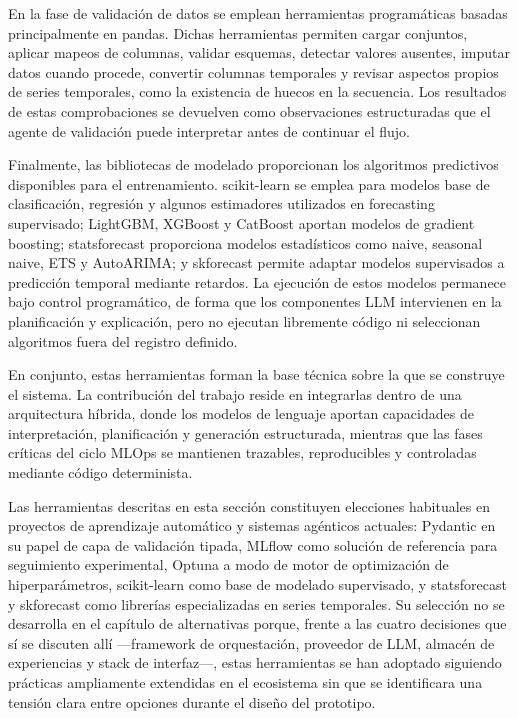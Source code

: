 \documentclass[12pt,a4paper]{article}
\theoremstyle{plain}
\begin{document}
En la fase de validación de datos se emplean herramientas programáticas basadas principalmente en pandas. Dichas herramientas permiten cargar conjuntos, aplicar mapeos de columnas, validar esquemas, detectar valores ausentes, imputar datos cuando procede, convertir columnas temporales y revisar aspectos propios de series temporales, como la existencia de huecos en la secuencia. Los resultados de estas comprobaciones se devuelven como observaciones estructuradas que el agente de validación puede interpretar antes de continuar el flujo.

Finalmente, las bibliotecas de modelado proporcionan los algoritmos predictivos disponibles para el entrenamiento. scikit-learn se emplea para modelos base de clasificación, regresión y algunos estimadores utilizados en forecasting supervisado; LightGBM, XGBoost y CatBoost aportan modelos de gradient boosting; statsforecast proporciona modelos estadísticos como naive, seasonal naive, ETS y AutoARIMA; y skforecast permite adaptar modelos supervisados a predicción temporal mediante retardos. La ejecución de estos modelos permanece bajo control programático, de forma que los componentes LLM intervienen en la planificación y explicación, pero no ejecutan libremente código ni seleccionan algoritmos fuera del registro definido.

En conjunto, estas herramientas forman la base técnica sobre la que se construye el sistema. La contribución del trabajo reside en integrarlas dentro de una arquitectura híbrida, donde los modelos de lenguaje aportan capacidades de interpretación, planificación y generación estructurada, mientras que las fases críticas del ciclo MLOps se mantienen trazables, reproducibles y controladas mediante código determinista.

\medskip
Las herramientas descritas en esta sección constituyen elecciones habituales en proyectos de aprendizaje automático y sistemas agénticos actuales: Pydantic en su papel de capa de validación tipada, MLflow como solución de referencia para seguimiento experimental, Optuna a modo de motor de optimización de hiperparámetros, scikit-learn como base de modelado supervisado, y statsforecast y skforecast como librerías especializadas en series temporales. Su selección no se desarrolla en el capítulo de alternativas porque, frente a las cuatro decisiones que sí se discuten allí ---framework de orquestación, proveedor de LLM, almacén de experiencias y stack de interfaz---, estas herramientas se han adoptado siguiendo prácticas ampliamente extendidas en el ecosistema sin que se identificara una tensión clara entre opciones durante el diseño del prototipo.
\end{document}
